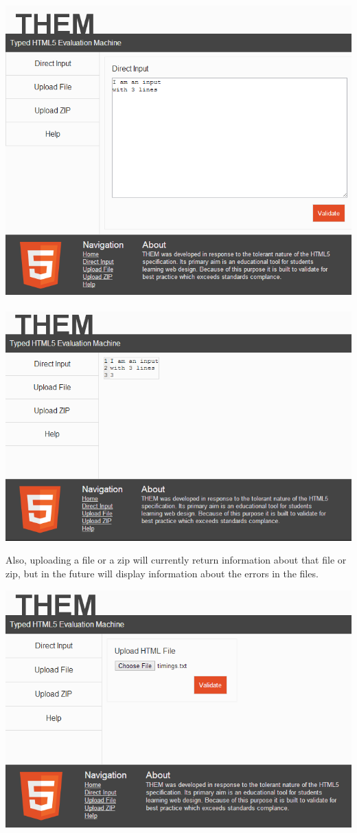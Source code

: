 \documentclass[12pt]{article}
\begin{document}
\includegraphics[scale=0.65]{direct_input.png} \\ \\

\includegraphics[scale=0.65]{returned_input.png}

Also, uploading a file or a zip will currently return information about that file or zip, but in the future will display information about the errors in the files.

\includegraphics[scale=0.65]{upload_file.png} \\ \\
\end{document}
